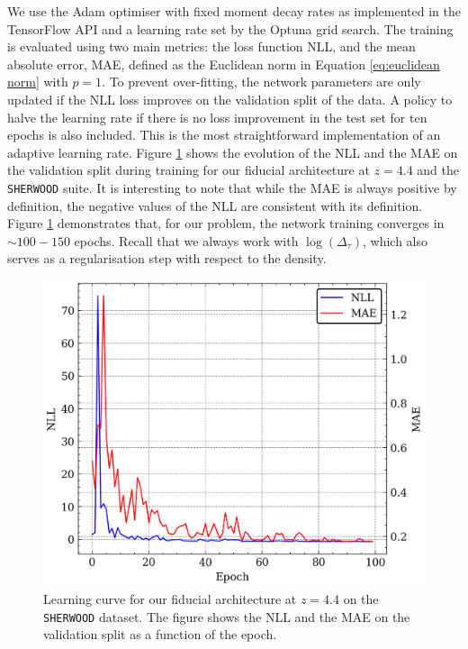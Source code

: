 We use the Adam optimiser with fixed moment decay rates as implemented in the TensorFlow API and a learning rate set by the Optuna grid search. The training is evaluated using two main metrics: the loss function NLL, and the mean absolute error, MAE, defined as the Euclidean norm in Equation \ref{eq:euclidean norm} with $p=1$. To prevent over-fitting, the network parameters are only updated if the NLL loss improves on the validation split of the data. A policy to halve the learning rate if there is no loss improvement in the test set for ten epochs is also included. This is the most straightforward implementation of an adaptive learning rate. Figure \ref{fig:ML learning curve} shows the evolution of the NLL and the MAE on the validation split during training for our fiducial architecture at $z=4.4$ and the \texttt{SHERWOOD} suite. It is interesting to note that while the MAE is always positive by definition, the negative values of the NLL are consistent with its definition. Figure \ref{fig:ML learning curve} demonstrates that, for our problem, the network training converges in $\sim 100-150$ epochs. Recall that we always work with $\log(\Delta_\tau)$, which also serves as a regularisation step with respect to the density.
\begin{figure}[h!]
    \centering
    \includegraphics[width=0.7\linewidth]{img/ML/learning_curve.png}
    \caption{Learning curve for our fiducial architecture at $z=4.4$ on the \texttt{SHERWOOD} dataset. The figure shows the NLL and the MAE on the validation split as a function of the epoch.}
    \label{fig:ML learning curve}
\end{figure}
